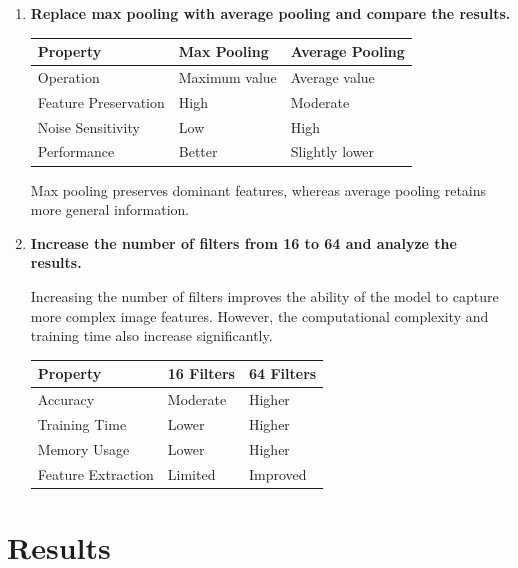 \documentclass[12pt,a4paper]{article}
\begin{document}
\begin{enumerate}
ReLU is widely used because it improves computational efficiency and reduces the vanishing gradient problem.

\item \textbf{Replace max pooling with average pooling and compare the results.}

\begin{center}
\begin{tabular}{|l|l|l|}
\hline
\textbf{Property} & \textbf{Max Pooling} & \textbf{Average Pooling} \\
\hline
Operation & Maximum value & Average value \\
\hline
Feature Preservation & High & Moderate \\
\hline
Noise Sensitivity & Low & High \\
\hline
Performance & Better & Slightly lower \\
\hline
\end{tabular}
\end{center}

Max pooling preserves dominant features, whereas average pooling retains more general information.

\item \textbf{Increase the number of filters from 16 to 64 and analyze the results.}

Increasing the number of filters improves the ability of the model to capture more complex image features. However, the computational complexity and training time also increase significantly.

\begin{center}
\begin{tabular}{|l|l|l|}
\hline
\textbf{Property} & \textbf{16 Filters} & \textbf{64 Filters} \\
\hline
Accuracy & Moderate & Higher \\
\hline
Training Time & Lower & Higher \\
\hline
Memory Usage & Lower & Higher \\
\hline
Feature Extraction & Limited & Improved \\
\hline
\end{tabular}
\end{center}

\end{enumerate}

\section{Results}
\end{document}
